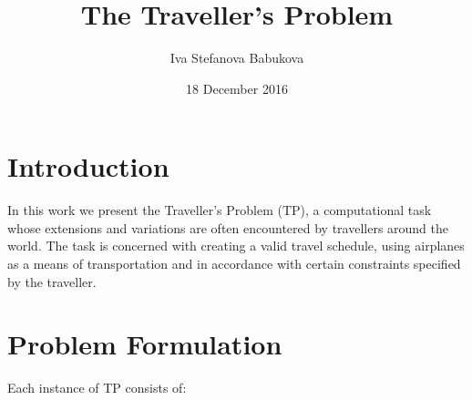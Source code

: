 \documentclass{mprop}
\theoremstyle{definition}
\begin{document}
\title{The Traveller's Problem}
\author{Iva Stefanova Babukova}
\date{18 December 2016}
\maketitle

\tableofcontents
\educationalconsent
\newpage

\section{Introduction}\label{intro}

In this work we present the Traveller's Problem (TP), a computational task whose extensions and variations are often encountered by travellers around the world. The task is concerned with creating a valid travel schedule, using airplanes as a means of transportation and in accordance with certain constraints specified by the traveller.

\section{Problem Formulation}

Each instance of TP consists of:
\end{document}
